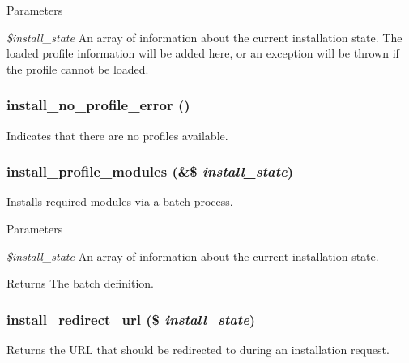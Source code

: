 \begin{DoxyParams}{Parameters}
\item[{\em \$install\_\-state}]An array of information about the current installation state. The loaded profile information will be added here, or an exception will be thrown if the profile cannot be loaded. \end{DoxyParams}
\hypertarget{install_8core_8inc_a78dd97fe8667cff59641b2adc55436cf}{
\subsubsection[{install\_\-no\_\-profile\_\-error}]{\setlength{\rightskip}{0pt plus 5cm}install\_\-no\_\-profile\_\-error ()}}
\label{install_8core_8inc_a78dd97fe8667cff59641b2adc55436cf}
Indicates that there are no profiles available. \hypertarget{install_8core_8inc_ab10e46f9de8a36a5f53c209781d24528}{
\subsubsection[{install\_\-profile\_\-modules}]{\setlength{\rightskip}{0pt plus 5cm}install\_\-profile\_\-modules (\&\$ {\em install\_\-state})}}
\label{install_8core_8inc_ab10e46f9de8a36a5f53c209781d24528}
Installs required modules via a batch process.


\begin{DoxyParams}{Parameters}
\item[{\em \$install\_\-state}]An array of information about the current installation state.\end{DoxyParams}
\begin{DoxyReturn}{Returns}
The batch definition. 
\end{DoxyReturn}
\hypertarget{install_8core_8inc_a6653d055f5af1ec01fa9769b41f747b5}{
\subsubsection[{install\_\-redirect\_\-url}]{\setlength{\rightskip}{0pt plus 5cm}install\_\-redirect\_\-url (\$ {\em install\_\-state})}}
\label{install_8core_8inc_a6653d055f5af1ec01fa9769b41f747b5}
Returns the URL that should be redirected to during an installation request.

